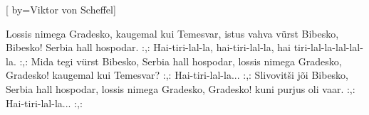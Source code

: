 
[
	by={Viktor von Scheffel}]
  
\beginverse*
Lossis nimega Gradesko,
kaugemal kui Temesvar,
istus vahva vürst Bibesko, Bibesko!
Serbia hall hospodar. 
\endverse
\beginchorus
:,: Hai-tiri-lal-la, hai-tiri-lal-la, 
hai tiri-lal-la-lal-lal-la. :,: 
\endchorus
\beginverse*
Mida tegi vürst Bibesko,
Serbia hall hospodar,
lossis nimega Gradesko, Gradesko!
kaugemal kui Temesvar?
\endverse
\beginchorus
:,: Hai-tiri-lal-la... :,: 
\endchorus
\beginverse*
Slivovitši jõi Bibesko,
Serbia hall hospodar,
lossis nimega Gradesko, Gradesko!
kuni purjus oli vaar.
\endverse
\beginchorus
:,: Hai-tiri-lal-la... :,: 
\endchorus
\endsong
